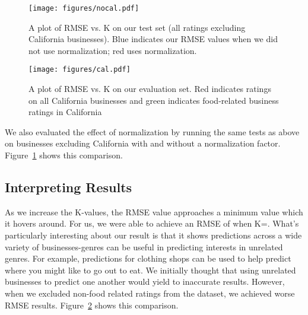 \begin{figure}[ht!]
	\centering
	\texttt{[image: figures/nocal.pdf]}
	\caption[]{A plot of RMSE vs. K on our test set (all ratings excluding California businesses). Blue indicates our RMSE values when we did not use normalization; red uses normalization.}
	\label{fig:nocal}
\end{figure}


\begin{figure}[ht!]
	\centering
	\texttt{[image: figures/cal.pdf]}
	\caption[]{A plot of RMSE vs. K on our evaluation set. Red indicates ratings on all California businesses and green indicates food-related business ratings in California}
	\label{fig:cal}
\end{figure}



We also evaluated the effect of normalization by running the same tests as
above on businesses excluding California with and without a normalization
factor. Figure~\ref{fig:nocal} shows this comparison.

\subsection{Interpreting Results}
As we increase the K-values, the RMSE value approaches a minimum value which it
hovers around. For us, we were able to achieve an RMSE of \bestRMSE when
K=\bestK.
What's particularly interesting about our result is that it shows predictions
across a wide variety of businesses-genres can be useful in predicting
interests in unrelated genres. For example, predictions for clothing shops can
be used to help predict where you might like to go out to eat. We initially
thought that using unrelated businesses to predict one another would yield to
inaccurate results. However, when we excluded non-food related ratings from the
dataset, we achieved worse RMSE results. Figure~\ref{fig:cal} shows this comparison.

